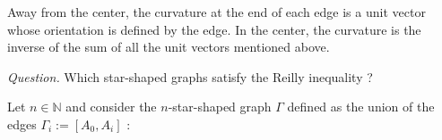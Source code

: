 \documentclass[12pt,english]{smfart} %
\theoremstyle{remark}
\begin{document}
Away from the center, the curvature at the end of each edge is a unit vector whose orientation is defined by the edge. In the center, the curvature is the inverse of the sum of all the unit vectors mentioned above. 


\vspace{1em}

\textit{Question.} Which star-shaped graphs satisfy the Reilly inequality ?

\vspace{1em}


Let $n \in \mathbb{N}$ and consider the $n$-star-shaped graph $\Gamma$ defined as the union of the edges $\Gamma_i := [A_0,A_i]$ :


\vspace{1em}
\end{document}
